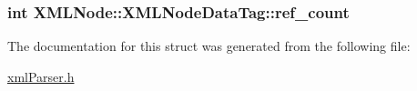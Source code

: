 \hypertarget{structXMLNode_1_1XMLNodeDataTag_a075384a405d8afe7de14982b1526912d}{
\subsubsection[{ref\-\_\-count}]{\setlength{\rightskip}{0pt plus 5cm}int X\-M\-L\-Node\-::\-X\-M\-L\-Node\-Data\-Tag\-::ref\-\_\-count}}\label{structXMLNode_1_1XMLNodeDataTag_a075384a405d8afe7de14982b1526912d}


The documentation for this struct was generated from the following file\-:\begin{DoxyCompactItemize}
\item 
\hyperlink{xmlParser_8h}{xml\-Parser.\-h}\end{DoxyCompactItemize}
